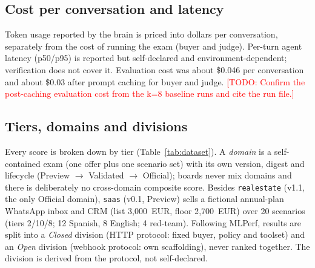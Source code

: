 \documentclass[11pt]{article}
\newcommand{\TODO}[1]{\textcolor{red}{[TODO: #1]}}
\newcommand{\code}[1]{\texttt{#1}}
\begin{document}
\subsection{Cost per conversation and latency}
Token usage reported by the brain is priced into dollars per conversation, separately from the cost of
running the exam (buyer and judge). Per-turn agent latency (p50/p95) is reported but self-declared and
environment-dependent; verification does not cover it.
Evaluation cost was about \$0.046 per conversation
and about \$0.03 after prompt caching for buyer and judge.
\TODO{Confirm the post-caching evaluation cost from the k=8 baseline runs and cite the run file.}

\subsection{Tiers, domains and divisions}
Every score is broken down by tier (Table~\ref{tab:dataset}). A \emph{domain} is a self-contained exam
(one offer plus one scenario set) with its own version, digest and lifecycle
(Preview $\to$ Validated $\to$ Official); boards never mix domains and there is deliberately no
cross-domain composite score.
Besides \code{realestate} (v1.1, the only Official domain), \code{saas} (v0.1, Preview) sells a fictional
annual-plan WhatsApp inbox and CRM (list 3{,}000~EUR, floor 2{,}700~EUR) over 20 scenarios
(tiers 2/10/8; 12 Spanish, 8 English; 4 red-team).
Following MLPerf, results are split into a \emph{Closed} division (HTTP protocol: fixed buyer, policy and
toolset) and an \emph{Open} division (webhook protocol: own scaffolding), never ranked together. The
division is derived from the protocol, not self-declared.
\end{document}
